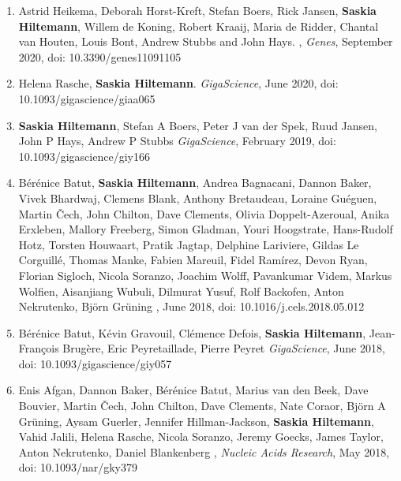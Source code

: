 \begin{enumerate}
\item Astrid Heikema, Deborah Horst-Kreft, Stefan Boers, Rick Jansen, \textbf{Saskia Hiltemann}, Willem de Koning, Robert Kraaij, Maria de Ridder, Chantal van Houten, Louis Bont, Andrew  Stubbs and John Hays. {\color{chaptergrey}{Comparison of Illumina versus Nanopore 16S rRNAGene Sequencing of the Human Nasal Microbiota}}, \textit{Genes}, September 2020, doi: 10.3390/genes11091105

\item Helena Rasche, \textbf{Saskia Hiltemann}. {\color{chaptergrey}{Galactic Circos: User-friendly Circos plots within the Galaxy platform.}} \textit{GigaScience}, June 2020, doi: 10.1093/gigascience/giaa065 \label{circos}

\item \textbf{Saskia Hiltemann}, Stefan A Boers, Peter J van der Spek, Ruud Jansen, John P Hays, Andrew P Stubbs {\color{chaptergrey}{Galaxy mothur Toolset (GmT): a user-friendly application for 16S rRNA gene sequencing analysis using mothur.}} \textit{GigaScience}, February 2019, doi: 10.1093/gigascience/giy166 \label{gmt}


\item Bérénice Batut, \textbf{Saskia Hiltemann}, Andrea Bagnacani, Dannon Baker, Vivek Bhardwaj, Clemens Blank, Anthony Bretaudeau, Loraine Guéguen, Martin Čech, John Chilton, Dave Clements, Olivia Doppelt-Azeroual, Anika Erxleben, Mallory Freeberg, Simon Gladman, Youri Hoogstrate, Hans-Rudolf Hotz, Torsten Houwaart, Pratik Jagtap, Delphine Lariviere, Gildas Le Corguillé, Thomas Manke, Fabien Mareuil, Fidel Ramírez, Devon Ryan, Florian Sigloch, Nicola Soranzo, Joachim Wolff, Pavankumar Videm, Markus Wolfien, Aisanjiang Wubuli, Dilmurat Yusuf, Rolf Backofen, Anton Nekrutenko, Björn Grüning {\color{chaptergrey}{Community-driven data analysis training for biology.}}, June 2018, doi: 10.1016/j.cels.2018.05.012 \label{gtn}

\item Bérénice Batut, Kévin Gravouil, Clémence Defois, \textbf{Saskia Hiltemann}, Jean-François Brugère, Eric Peyretaillade, Pierre Peyret {\color{chaptergrey}{ASaiM: a Galaxy-based framework to analyze raw shotgun data from microbiota.}} \textit{GigaScience}, June 2018, doi: 10.1093/gigascience/giy057

\item  Enis Afgan, Dannon Baker, Bérénice Batut, Marius van den Beek, Dave Bouvier, Martin Čech, John Chilton, Dave Clements, Nate Coraor, Björn A Grüning, Aysam Guerler, Jennifer Hillman-Jackson, \textbf{Saskia Hiltemann}, Vahid Jalili, Helena Rasche, Nicola Soranzo, Jeremy Goecks, James Taylor, Anton Nekrutenko, Daniel Blankenberg {\color{chaptergrey}{The Galaxy platform for accessible, reproducible and collaborative biomedical analyses: 2018 update }}, \textit{Nucleic Acids Research}, May 2018, doi: 10.1093/nar/gky379 \label{galaxy}


\end{enumerate}
